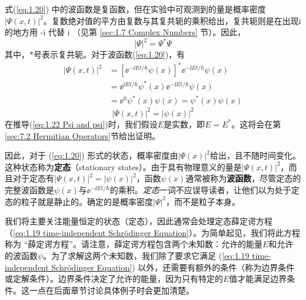 	式(\ref{eq:1.20}) 中的波函数是复函数，但在实验中可观测到的量是概率密度$\left|\Psi\left(x,t\right)\right|^2$。复数绝对值的平方由复数与其复共轭的乘积给出，复共轭则是在出现i的地方用 -i 代替 i （见第 \ref{sec:1.7 Complex Numbers} 节）。因此，
	\begin{equation}
		\boxed{\left|\Psi\right|^2=\Psi^{\ast}\Psi}
		\label{eq:1.21 square of Psi}
	\end{equation}
	其中，$\ast$号表示复共轭。对于波函数(\ref{eq:1.20})，有
	\begin{equation*}
		\begin{aligned}
			\left|\Psi\left(x,t\right)\right|^2 &=\left[\ee^{-\ii Et/\hbar}\psi\left(x\right)\right]^{\ast}\ee^{-\ii Et/\hbar}\psi\left(x\right)\\
			& = \ee^{\ii Et/\hbar}\psi^{\ast}\left(x\right)\ee^{-\ii Et/\hbar}\psi\left(x\right)\\
			& = \ee^0\psi^{\ast}\left(x\right)\psi\left(x\right)=\psi^\ast\left(x\right)\psi\left(x\right)
		\end{aligned}
	\end{equation*}
	\begin{equation}
		\left|\Psi\left(x,t\right)\right|^2=\left|\psi\left(x\right)\right|^2
		\label{eq:1.22 Psi and psi}
	\end{equation}
	在推导(\ref{eq:1.22 Psi and psi})时，我们假设$E$是实数，即$E=E^{\ast}$。这将会在第\ref{sec:7.2 Hermitian Operators}节给出证明。

	因此，对于 (\ref{eq:1.20}) 形式的状态，概率密度由$\left|\Psi\left(x\right)\right|^2$给出，且不随时间变化。这种状态称为\textbf{定态}（stationary states）。由于具有物理意义的量是$\left|\Psi\left(x,t\right)\right|^2$，而且对于定态有$\left|\Psi\left(x,t\right)\right|^2=\left|\psi\left(x\right)\right|^2$，函数$\psi\left(x\right)$通常被称为\textbf{波函数}，尽管定态的完整波函数是$\psi\left(x\right)$与$\ee^{-\ii Et/\hbar}$的乘积。\textit{定态}一词不应误导读者，让他们以为处于定态的粒子就是静止的。确定的是概率密度$\left|\Psi\right|^2$，而不是粒子本身。

	我们将主要关注能量恒定的状态（定态），因此通常会处理定态薛定谔方程（\ref{eq:1.19 time-independent Schrödinger Equation}）。为简单起见，我们将此方程称为 “薛定谔方程”。请注意，薛定谔方程包含两个未知数：允许的能量$E$和允许的波函数$ \psi$。为了求解这两个未知数，我们除了要求它满足 (\ref{eq:1.19 time-independent Schrödinger Equation}) 以外，还需要有额外的条件（称为边界条件或定解条件）。边界条件决定了允许的能量，因为只有特定的$E$值才能满足边界条件。这一点在后面章节讨论具体例子时会更加清楚。
	
